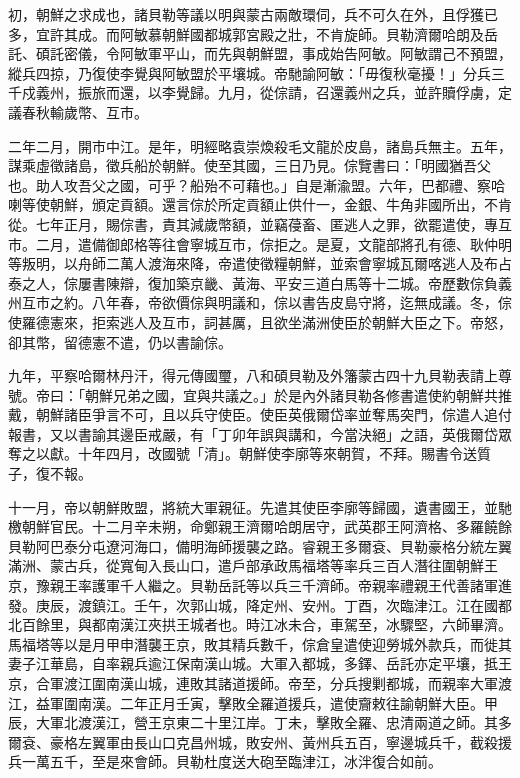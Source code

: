 \begin{pinyinscope}
初，朝鮮之求成也，諸貝勒等議以明與蒙古兩敵環伺，兵不可久在外，且俘獲已多，宜許其成。而阿敏慕朝鮮國都城郭宮殿之壯，不肯旋師。貝勒濟爾哈朗及岳託、碩託密儀，令阿敏軍平山，而先與朝鮮盟，事成始告阿敏。阿敏謂己不預盟，縱兵四掠，乃復使李覺與阿敏盟於平壤城。帝馳諭阿敏：「毋復秋毫擾！」分兵三千戍義州，振旅而還，以李覺歸。九月，從倧請，召還義州之兵，並許贖俘虜，定議春秋輸歲幣、互市。

二年二月，開市中江。是年，明經略袁崇煥殺毛文龍於皮島，諸島兵無主。五年，謀乘虛徵諸島，徵兵船於朝鮮。使至其國，三日乃見。倧覽書曰：「明國猶吾父也。助人攻吾父之國，可乎？船殆不可藉也。」自是漸渝盟。六年，巴都禮、察哈喇等使朝鮮，頒定貢額。還言倧於所定貢額止供什一，金銀、牛角非國所出，不肯從。七年正月，賜倧書，責其減歲幣額，並竊葠畜、匿逃人之罪，欲罷遣使，專互市。二月，遣備御郎格等往會寧城互市，倧拒之。是夏，文龍部將孔有德、耿仲明等叛明，以舟師二萬人渡海來降，帝遣使徵糧朝鮮，並索會寧城瓦爾喀逃人及布占泰之人，倧屢書陳辯，復加築京畿、黃海、平安三道白馬等十二城。帝歷數倧負義州互市之約。八年春，帝欲價倧與明議和，倧以書告皮島守將，迄無成議。冬，倧使羅德憲來，拒索逃人及互市，詞甚厲，且欲坐滿洲使臣於朝鮮大臣之下。帝怒，卻其幣，留德憲不遣，仍以書諭倧。

九年，平察哈爾林丹汗，得元傳國璽，八和碩貝勒及外籓蒙古四十九貝勒表請上尊號。帝曰：「朝鮮兄弟之國，宜與共議之。」於是內外諸貝勒各修書遣使約朝鮮共推戴，朝鮮諸臣爭言不可，且以兵守使臣。使臣英俄爾岱率並奪馬突門，倧遣人追付報書，又以書諭其邊臣戒嚴，有「丁卯年誤與講和，今當決絕」之語，英俄爾岱眾奪之以獻。十年四月，改國號「清」。朝鮮使李廓等來朝賀，不拜。賜書令送質子，復不報。

十一月，帝以朝鮮敗盟，將統大軍親征。先遣其使臣李廓等歸國，遺書國王，並馳檄朝鮮官民。十二月辛未朔，命鄭親王濟爾哈朗居守，武英郡王阿濟格、多羅饒餘貝勒阿巴泰分屯遼河海口，備明海師援襲之路。睿親王多爾袞、貝勒豪格分統左翼滿洲、蒙古兵，從寬甸入長山口，遣戶部承政馬福塔等率兵三百人潛往圍朝鮮王京，豫親王率護軍千人繼之。貝勒岳託等以兵三千濟師。帝親率禮親王代善諸軍進發。庚辰，渡鎮江。壬午，次郭山城，降定州、安州。丁酉，次臨津江。江在國都北百餘里，與都南漢江夾拱王城者也。時江冰未合，車駕至，冰驟堅，六師畢濟。馬福塔等以是月甲申潛襲王京，敗其精兵數千，倧倉皇遣使迎勞城外款兵，而徙其妻子江華島，自率親兵逾江保南漢山城。大軍入都城，多鐸、岳託亦定平壤，抵王京，合軍渡江圍南漢山城，連敗其諸道援師。帝至，分兵搜剿都城，而親率大軍渡江，益軍圍南漢。二年正月壬寅，擊敗全羅道援兵，遣使齎敕往諭朝鮮大臣。甲辰，大軍北渡漢江，營王京東二十里江岸。丁未，擊敗全羅、忠清兩道之師。其多爾袞、豪格左翼軍由長山口克昌州城，敗安州、黃州兵五百，寧邊城兵千，截殺援兵一萬五千，至是來會師。貝勒杜度送大砲至臨津江，冰泮復合如前。


\end{pinyinscope}
